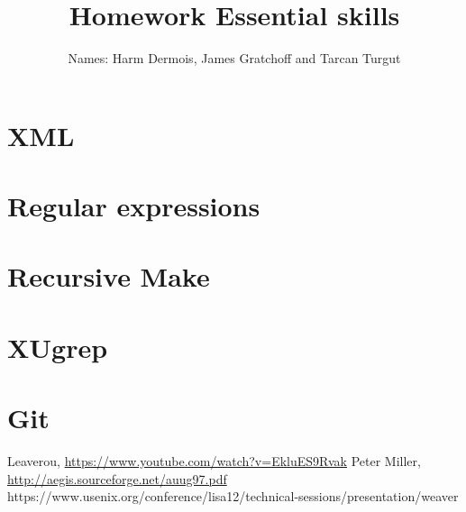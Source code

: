 \documentclass[12pt,a4paper]{article}
\begin{document}
\title{Homework Essential skills}
\author{Names: Harm Dermois, James Gratchoff and Tarcan Turgut }
\date{}
\maketitle

\section{XML}

\section{Regular expressions}

\section{Recursive Make}

\section{XUgrep}

\section{Git}


\begin{thebibliography}{9}
	Leaverou,
	\url{https://www.youtube.com/watch?v=EkluES9Rvak}
	Peter Miller,
	\url{http://aegis.sourceforge.net/auug97.pdf}
	https://www.usenix.org/conference/lisa12/technical-sessions/presentation/weaver

\end{thebibliography}
\end{document}
